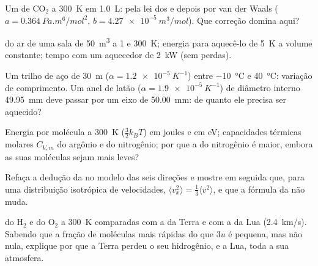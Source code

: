 \begin{exercise}[$\star\star$]\label{exo:b1:kinetic-theory:7}
Um  de CO$_2$ a \qty{300}{K} em \qty{1.0}{L}:  pela lei dos  e depois por van der Waals ($a = \qty{0.364}{Pa.m^6/mol^2}$,
$b = \qty{4.27e-5}{m^3/mol}$). Que correção domina aqui?
\end{exercise}

\begin{exercise}[$\star\star$]\label{exo:b1:kinetic-theory:8}
 do ar de uma sala de \qty{50}{m^3} a \qty{1}{} e
\qty{300}{K}; energia para aquecê-lo de \qty{5}{K} a volume constante; tempo
com um aquecedor de \qty{2}{kW} (sem perdas).
\end{exercise}

\begin{exercise}[$\star\star$]\label{exo:b1:kinetic-theory:9}
Um trilho de aço de \qty{30}{m} ($\alpha = \qty{1.2e-5}{K^{-1}}$) entre
\qty{-10}{\degreeCelsius} e \qty{40}{\degreeCelsius}: variação de comprimento.
Um anel de latão ($\alpha = \qty{1.9e-5}{K^{-1}}$) de diâmetro interno
\qty{49.95}{mm} deve passar por um eixo de \qty{50.00}{mm}: de quanto ele
precisa ser aquecido?
\end{exercise}

\begin{exercise}[$\star\star\star$]\label{exo:b1:kinetic-theory:10}
Energia por molécula a \qty{300}{K} ($\tfrac32 k_BT$) em joules e em eV;
capacidades térmicas molares $C_{V,m}$ do argônio e do nitrogênio; por que a
do nitrogênio é maior, embora as suas moléculas sejam mais leves?
\end{exercise}

\begin{exercise}[$\star\star\star$]\label{exo:b1:kinetic-theory:11}
Refaça a dedução da  no modelo das seis direções e mostre
em seguida que, para uma distribuição isotrópica de velocidades, $\langle v_x^2\rangle
= \tfrac13\langle v^2\rangle$, e que a fórmula da  não muda.
\end{exercise}

\begin{exercise}[$\star\star\star$]\label{exo:b1:kinetic-theory:12}
 do H$_2$ e do O$_2$ a \qty{300}{K} comparadas com
a  da Terra e com a da Lua (\qty{2.4}{km/s}).
Sabendo que a fração de moléculas mais rápidas do que $3u$ é pequena, mas não
nula, explique por que a Terra perdeu o seu hidrogênio, e a Lua, toda a sua
atmosfera.
\end{exercise}

